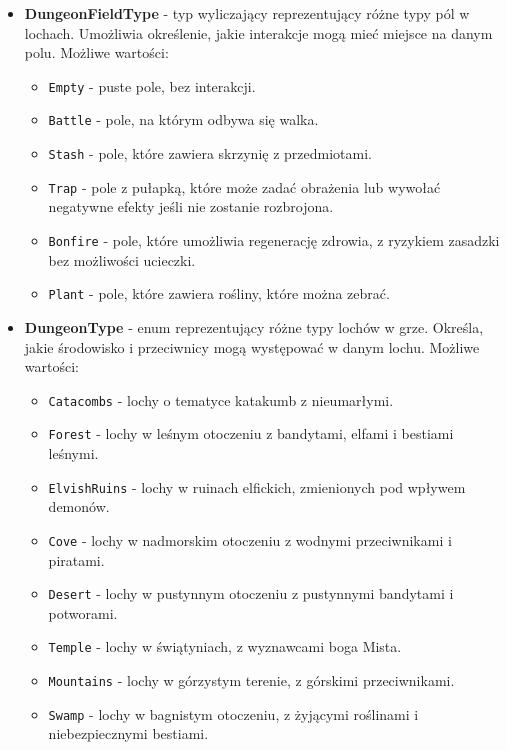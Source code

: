 \begin{itemize}
\begin{itemize}
            \end{itemize}
        \item \textbf{DungeonFieldType} - typ wyliczający reprezentujący różne typy pól w lochach. 
        Umożliwia określenie, jakie interakcje mogą mieć miejsce na danym polu. Możliwe wartości:
            \begin{itemize}
                \item \texttt{Empty} - puste pole, bez interakcji.
                \item \texttt{Battle} - pole, na którym odbywa się walka.
                \item \texttt{Stash} - pole, które zawiera skrzynię z przedmiotami.
                \item \texttt{Trap} - pole z pułapką, które może zadać obrażenia lub wywołać negatywne efekty jeśli nie zostanie rozbrojona.
                \item \texttt{Bonfire} - pole, które umożliwia regenerację zdrowia, z ryzykiem zasadzki bez możliwości ucieczki.
                \item \texttt{Plant} - pole, które zawiera rośliny, które można zebrać.
            \end{itemize}
        \item \textbf{DungeonType} - enum reprezentujący różne typy lochów w grze. 
        Określa, jakie środowisko i przeciwnicy mogą występować w danym lochu. Możliwe wartości:
                \begin{itemize}
                    \item \texttt{Catacombs} - lochy o tematyce katakumb z nieumarłymi.
                    \item \texttt{Forest} - lochy w leśnym otoczeniu z bandytami, elfami i bestiami leśnymi.
                    \item \texttt{ElvishRuins} - lochy w ruinach elfickich, zmienionych pod wpływem demonów.
                    \item \texttt{Cove} - lochy w nadmorskim otoczeniu z wodnymi przeciwnikami i piratami.
                    \item \texttt{Desert} - lochy w pustynnym otoczeniu z pustynnymi bandytami i potworami.
                    \item \texttt{Temple} - lochy w świątyniach, z wyznawcami boga Mista.
                    \item \texttt{Mountains} - lochy w górzystym terenie, z górskimi przeciwnikami.
                    \item \texttt{Swamp} - lochy w bagnistym otoczeniu, z żyjącymi roślinami i niebezpiecznymi bestiami.

\end{itemize}
\end{itemize}
